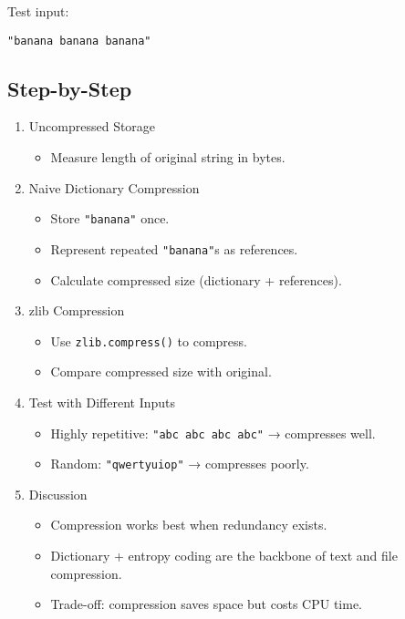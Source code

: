 \documentclass[
  letterpaper,
  DIV=11,
  numbers=noendperiod]{scrreprt}
\providecommand{\tightlist}{%
  \setlength{\itemsep}{0pt}\setlength{\parskip}{0pt}}
\begin{document}
Test input:

\begin{verbatim}
"banana banana banana"
\end{verbatim}

\subsection{Step-by-Step}\label{step-by-step-13}

\begin{enumerate}
\def\labelenumi{\arabic{enumi}.}
\item
  Uncompressed Storage

  \begin{itemize}
  \tightlist
  \item
    Measure length of original string in bytes.
  \end{itemize}
\item
  Naive Dictionary Compression

  \begin{itemize}
  \tightlist
  \item
    Store \texttt{"banana"} once.
  \item
    Represent repeated \texttt{"banana"}s as references.
  \item
    Calculate compressed size (dictionary + references).
  \end{itemize}
\item
  zlib Compression

  \begin{itemize}
  \tightlist
  \item
    Use \texttt{zlib.compress()} to compress.
  \item
    Compare compressed size with original.
  \end{itemize}
\item
  Test with Different Inputs

  \begin{itemize}
  \tightlist
  \item
    Highly repetitive: \texttt{"abc\ abc\ abc\ abc"} → compresses well.
  \item
    Random: \texttt{"qwertyuiop"} → compresses poorly.
  \end{itemize}
\item
  Discussion

  \begin{itemize}
  \tightlist
  \item
    Compression works best when redundancy exists.
  \item
    Dictionary + entropy coding are the backbone of text and file
    compression.
  \item
    Trade-off: compression saves space but costs CPU time.
  \end{itemize}
\end{enumerate}
\end{document}
